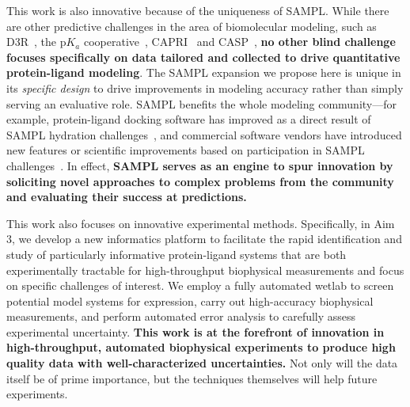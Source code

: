 \documentclass[11pt]{article}
\begin{document}



This work is also innovative because of the uniqueness of SAMPL.
While there are other predictive challenges in the area of biomolecular modeling, such as D3R~\cite{gathiaka_d3r_2016}, the p$K_a$ cooperative~\cite{Nielsen:2011:Proteins}, CAPRI~\cite{Janin:2005:ProteinScience} and CASP~\cite{Moult:2014:Proteins},
\textbf{no other blind challenge focuses specifically on data tailored and collected to drive quantitative protein-ligand modeling}.
The SAMPL expansion we propose here is unique in its \emph{specific design} to drive improvements in modeling accuracy rather than simply serving an evaluative role.
SAMPL benefits the whole modeling community---for example, protein-ligand docking software has improved as a direct result of SAMPL hydration challenges~\cite{coleman_sampl4_2014}, and commercial software vendors have introduced new features or scientific improvements based on participation in SAMPL challenges~\cite{reinisch_prediction_2012, klamt_prediction_2016}.
In effect, {\bf SAMPL serves as an engine to spur innovation by soliciting novel approaches to complex problems from the community and evaluating their success at predictions.}
 

This work also focuses on innovative experimental methods.
Specifically, in Aim 3, we develop a new informatics platform to facilitate the rapid identification and study of particularly informative protein-ligand systems that are both experimentally tractable for high-throughput biophysical measurements and focus on specific challenges of interest.
We employ a fully automated wetlab to screen potential model systems for expression, carry out high-accuracy biophysical measurements, and perform automated error analysis to carefully assess experimental uncertainty.
\textbf{This work is at the forefront of innovation in high-throughput, automated biophysical experiments to produce high quality data with well-characterized uncertainties.} 
Not only will the data itself be of prime importance, but the techniques themselves will help future experiments.
\end{document}
